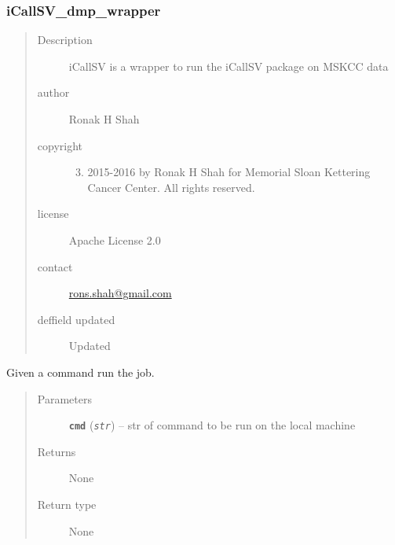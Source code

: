 \documentclass[letterpaper,10pt,english]{sphinxmanual}
\begin{document}
\subsubsection{iCallSV\_dmp\_wrapper}
\label{iCallSV:icallsv-dmp-wrapper}\begin{quote}\begin{description}
\item[{Description}] \leavevmode
iCallSV is a wrapper to run the iCallSV package on MSKCC data

\item[{author}] \leavevmode
Ronak H Shah

\item[{copyright}] \leavevmode\begin{enumerate}
\setcounter{enumi}{2}
\item {} 
2015-2016 by Ronak H Shah for Memorial Sloan Kettering Cancer Center. All rights reserved.

\end{enumerate}

\item[{license}] \leavevmode
Apache License 2.0

\item[{contact}] \leavevmode
\href{mailto:rons.shah@gmail.com}{rons.shah@gmail.com}

\item[{deffield    updated}] \leavevmode
Updated

\end{description}\end{quote}

\begin{fulllineitems}
\label{iCallSV:iCallSV.iCallSV_dmp_wrapper.RunJob}
Given a command run the job.
\begin{quote}\begin{description}
\item[{Parameters}] \leavevmode
\textbf{\texttt{cmd}} (\emph{\texttt{str}}) -- str of command to be run on the local machine

\item[{Returns}] \leavevmode
None

\item[{Return type}] \leavevmode
None

\end{description}\end{quote}

\end{fulllineitems}
\end{document}
